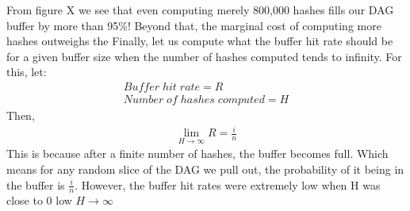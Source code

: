 \documentclass[10pt, conference, compsocconf]{IEEEtran}
\begin{document}
From figure X we see that even computing merely 800,000 hashes fills our DAG buffer by more than 95\%! Beyond that, the marginal cost of computing more hashes outweighs the 
Finally, let us compute what the buffer hit rate should be for a given buffer size when the number of hashes computed tends to infinity. For this, let:
\begin{gather}
  Buffer\;hit\;rate = R \\
    Number\;of\;hashes\;computed = H
\end{gather}
Then,
\begin{gather}
  \lim_{H\to\infty}R = \frac{i}{n}
\end{gather}
This is because after a finite number of hashes, the buffer becomes full. Which means for any random slice of the DAG we pull out, the probability of it being in the buffer is $\frac{i}{n}$. However, the buffer hit rates were extremely low when H was close to 0 low $H\to\infty$
\end{document}
